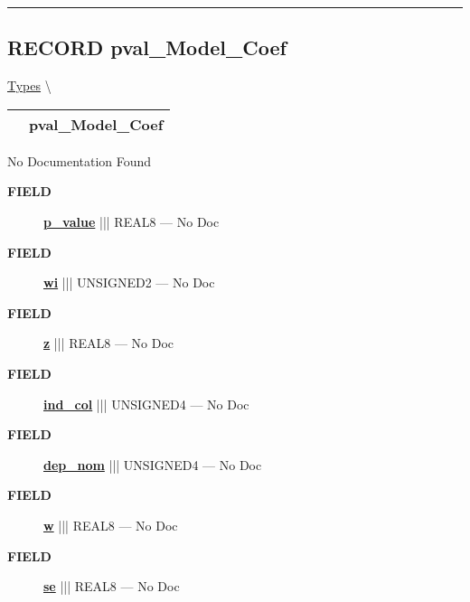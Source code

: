 \rule{\linewidth}{0.5pt}
\subsection*{\textsf{\colorbox{headtoc}{\color{white} RECORD}
pval\_Model\_Coef}}

\hypertarget{ecldoc:logisticregression.types.pval_model_coef}{}
\hspace{0pt} \hyperlink{ecldoc:LogisticRegression.Types}{Types} \textbackslash 

{\renewcommand{\arraystretch}{1.5}
\begin{tabularx}{\textwidth}{|>{\raggedright\arraybackslash}l|X|}
\hline
\hspace{0pt}\mytexttt{\color{red} } & \textbf{pval\_Model\_Coef} \\
\hline
\end{tabularx}
}

\par





No Documentation Found







\par
\begin{description}
\item [\colorbox{tagtype}{\color{white} \textbf{\textsf{FIELD}}}] \textbf{\underline{p\_value}} ||| REAL8 --- No Doc
\item [\colorbox{tagtype}{\color{white} \textbf{\textsf{FIELD}}}] \textbf{\underline{wi}} ||| UNSIGNED2 --- No Doc
\item [\colorbox{tagtype}{\color{white} \textbf{\textsf{FIELD}}}] \textbf{\underline{z}} ||| REAL8 --- No Doc
\item [\colorbox{tagtype}{\color{white} \textbf{\textsf{FIELD}}}] \textbf{\underline{ind\_col}} ||| UNSIGNED4 --- No Doc
\item [\colorbox{tagtype}{\color{white} \textbf{\textsf{FIELD}}}] \textbf{\underline{dep\_nom}} ||| UNSIGNED4 --- No Doc
\item [\colorbox{tagtype}{\color{white} \textbf{\textsf{FIELD}}}] \textbf{\underline{w}} ||| REAL8 --- No Doc
\item [\colorbox{tagtype}{\color{white} \textbf{\textsf{FIELD}}}] \textbf{\underline{se}} ||| REAL8 --- No Doc
\end{description}





